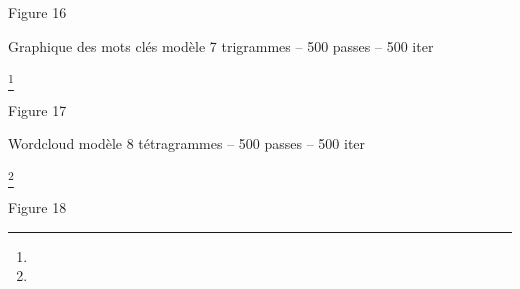\documentclass[letterpaper,portrait,12pt]{article}
\begin{document}
Figure 16





Graphique des mots cl\'{e}s mod\`{e}le 7 trigrammes -- 500 passes -- 500 iter





\footnote{} 
























































Figure 17





Wordcloud mod\`{e}le 8 t\'{e}tragrammes -- 500 passes -- 500 iter








\footnote{} 





























Figure 18
\end{document}
